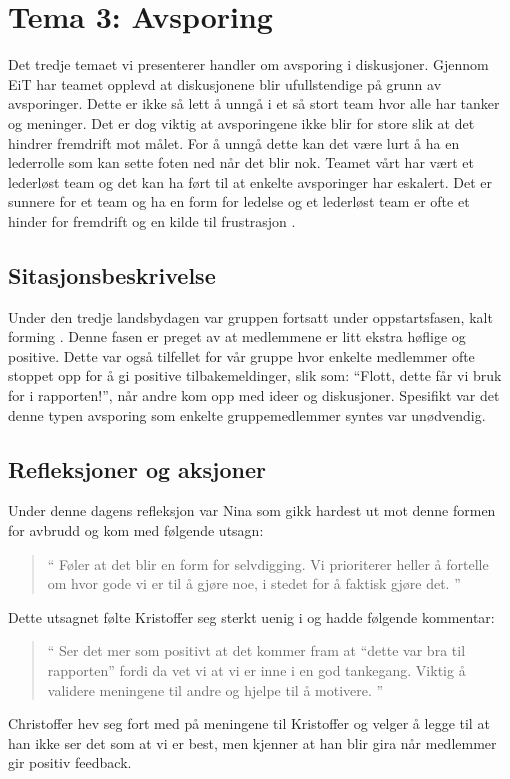 \chapter{Tema 3: Avsporing}

Det tredje temaet vi presenterer handler om avsporing i diskusjoner. Gjennom EiT har teamet opplevd at diskusjonene
blir ufullstendige på grunn av avsporinger. Dette er ikke så lett å unngå i et så stort team hvor alle har tanker og meninger.
Det er dog viktig at avsporingene ikke blir for store slik at det hindrer fremdrift mot målet. For å unngå dette kan det være lurt
å ha en lederrolle som kan sette foten ned når det blir nok. Teamet vårt har vært et lederløst team og det kan ha ført til at 
enkelte avsporinger har eskalert. Det er sunnere for et team og ha en form for ledelse og et lederløst team er ofte et hinder for 
fremdrift og en kilde til frustrasjon \cite{Artikkel4}.

\section{Sitasjonsbeskrivelse}

Under den tredje landsbydagen var gruppen fortsatt under oppstartsfasen, kalt forming \cite{forming}. Denne fasen er preget av at medlemmene er 
litt ekstra høflige og positive. Dette var også tilfellet for vår gruppe hvor enkelte medlemmer ofte stoppet opp for å gi positive 
tilbakemeldinger, slik som: ``Flott, dette får vi bruk for i rapporten!'', når andre kom opp med ideer og diskusjoner. Spesifikt var det 
denne typen avsporing som enkelte gruppemedlemmer syntes var unødvendig.

\section{Refleksjoner og aksjoner}

 Under denne dagens refleksjon var Nina  som gikk hardest ut mot denne formen for avbrudd og kom med følgende utsagn: 
\begin{quote}``
Føler at det blir en form for selvdigging. Vi prioriterer heller å fortelle om hvor gode vi er til å gjøre noe, i 
stedet for å faktisk gjøre det.
''\end{quote} 

Dette utsagnet følte Kristoffer seg sterkt uenig i og hadde følgende kommentar:
\begin{quote}``
Ser det mer som positivt at det kommer fram at ``dette 
var bra til rapporten'' fordi da vet vi at vi er inne i en god tankegang. Viktig å validere meningene til andre og hjelpe til å motivere. 
''\end{quote}  
Christoffer hev seg fort med på meningene til Kristoffer og velger å legge til at han ikke ser det som at vi er best, men kjenner at han 
blir gira når medlemmer gir positiv feedback. 

